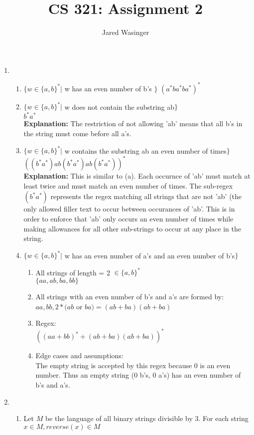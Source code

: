 \documentclass{article}
\begin{document}
  \title{CS 321: Assignment 2}
  \author{Jared Wasinger}

  \maketitle

  \begin{enumerate}
    \item\begin{enumerate}
      \item $\{w \in \{a,b\}^*|$ w has an even number of b's $\}$
      $(a^*ba^*ba^*)^*$
      \item $\{w \in \{a,b\}^*|$ w does not contain the substring ab$\}$\\
      $b^*a^*$\\
      \textbf{Explanation:} The restriction of not allowing 'ab' means that all b's in the string must come before all a's.
      \item $\{w \in \{a,b\}^*|$ w contains the substring ab an even number of times$\}$
      $((b^*a^*)ab(b^*a^*)ab(b^*a^*))^*$\\
      \textbf{Explanation:}
      This is similar to (a).  Each occurnce of 'ab' must match at least twice and must match an even number of times. The sub-regex $(b^*a^*)$ represents the regex matching all strings that are not 'ab' (the only allowed filler text to occur between occurances of 'ab'.  This is in order to enforce that 'ab' only occurs an even number of times while making allowances for all other sub-strings to occur at any place in the string.
      \item $\{w \in \{a,b\}^*|$ w has an even number of a's and an even number of b's$\}$ \begin{enumerate}
        \item All strings of length = 2 $\in \{a,b\}^*$\\
          $\{aa,ab,ba,bb\}$
        \item All strings with an even number of b's and a's are formed by:\\
          $aa, bb, 2*(ab$ or $ba) = (ab+ba)(ab+ba)$
        \item Regex:\\
          $((aa+bb)^*+(ab+ba)(ab+ba))^*$\\
        \item Edge cases and assumptions:\\
          The empty string is accepted by this regex because 0 is an even number.  Thus an empty string (0 b's, 0 a's) has an even number of b's and a's.
        \end{enumerate}
      \end{enumerate}
    \item\begin{enumerate}
      \item Let $M$ be the language of all binary strings divisible by $3$.  For each string $x \in M, reverse(x) \in M$
    \end{enumerate}
  \end{enumerate}
\end{document}
